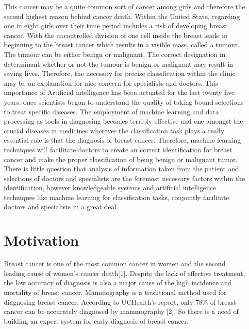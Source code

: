 \documentclass[conference]{IEEEtran}
\begin{document}
This cancer may be a quite common sort of cancer among girls and therefore the
second highest reason behind cancer death. Within the United State, regarding one in eight girls over their time period includes a risk of developing breast cancer. With the uncontrolled division of one cell inside the breast leads to beginning to the breast cancer which results in a visible mass, called a tumour. The tumour can be either benign or malignant. The correct designation in determinant whether or not the tumour is benign or malignant may result in saving lives. Therefore, the necessity for precise classification within the clinic may be an explanation for nice concern for specialists and doctors. This importance of Artificial intelligence has been actuated for the last twenty five years, once scientists began to understand the quality of taking bound selections to treat specific diseases. The employment of machine learning and data processing as tools in diagnosing becomes terribly effective and one amongst the crucial diseases in medicines wherever the classification task plays a really essential role is that the diagnosis of breast cancer. 
Therefore, machine learning techniques will facilitate doctors to create an correct identification for breast cancer and make the proper classification of being benign or malignant tumor. There is little question that analysis of information taken from the patient and selections of doctors and specialists are the foremost necessary factors within the identification, however knowledgeable systems and artificial intelligence techniques like machine learning for classification tasks, conjointly facilitate doctors and specialists in a great deal.

\section{Motivation}
Breast cancer is one of the most common cancer in women and the second leading cause of women’s cancer death[1]. Despite the lack of effective treatment, the low accuracy of diagnosis is also a major cause of the high incidence and mortality of breast cancer. Mammography is a traditional method used for diagnosing breast cancer. According to UCHealth’s report, only 78\% of breast cancer can be accurately diagnosed by mammography [2]. So there is a need of building an expert system for early diagnosis of breast cancer.
\end{document}
